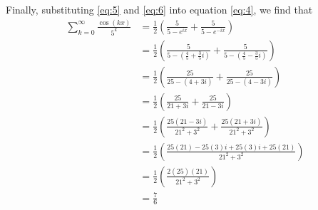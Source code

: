 \documentclass{scrartcl}
\begin{document}
Finally, substituting \eqref{eq:5} and \eqref{eq:6} into equation \eqref{eq:4}, we find that
\begin{align*}
  \sum_{k=0}^{\infty}\frac{\cos{(kx)}}{5^k} &=\frac{1}{2}\left(\frac{5}{5-e^{ix}} + \frac{5}{5-e^{-ix}}\right) \\
  &=\frac{1}{2}\left(\frac{5}{5-\left(\frac{4}{5} + \frac{3}{5}i\right)} + \frac{5}{5-\left(\frac{4}{5} - \frac{3}{5}i\right)}\right) \\
  &=\frac{1}{2}\left(\frac{25}{25-\left(4 + 3i\right)} + \frac{25}{25-\left(4 - 3i\right)}\right) \\
  &=\frac{1}{2}\left(\frac{25}{21 + 3i} + \frac{25}{21 - 3i}\right) \\
  &=\frac{1}{2}\left(\frac{25\left(21 - 3i\right)}{21^2 + 3^2} + \frac{25\left(21 + 3i\right)}{21^2 + 3^2}\right) \\
  &=\frac{1}{2}\left(\frac{25(21) - 25(3)i + 25(3)i + 25(21)}{21^2 + 3^2}\right) \\
  &=\frac{1}{2}\left(\frac{2(25)(21)}{21^2 + 3^2}\right) \\
  &= \frac{7}{6}
\end{align*}
\end{document}
